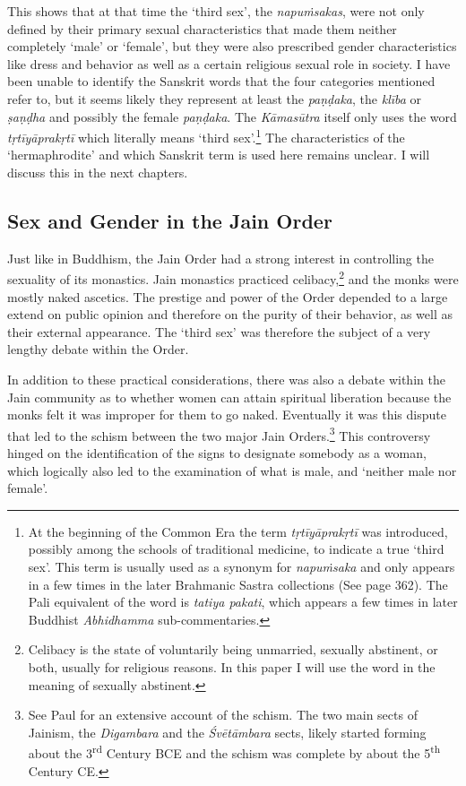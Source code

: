 This shows that at that time the `third sex', the \textit{napuṁsakas}, were not only defined by their primary sexual characteristics that made them neither completely `male' or `female', but they were also prescribed gender characteristics like dress and behavior as well as a certain religious sexual role in society. I have been unable to identify the Sanskrit words that the four categories mentioned refer to, but it seems likely they represent at least the \textit{paṇḍaka}, the \textit{klība} or \textit{ṣaṇḍha} and possibly the female \textit{paṇḍaka}. The \textit{Kāmasūtra} itself only uses the word \textit{tṛtīyāprakṛtī} which literally means `third sex'.\footnote{At the beginning of the Common Era the term \textit{tṛtīyāprakṛtī} was introduced, possibly among the schools of traditional medicine, to indicate a true `third sex'. This term is usually used as a synonym for \textit{napuṁsaka} and only appears in a few times in the later Brahmanic Sastra collections (See \cite{zwilling} page 362). The Pali equivalent of the word is \textit{tatiya pakati}, which appears a few times in later Buddhist \textit{Abhidhamma} sub-commentaries.} The characteristics of the `hermaphrodite' and which Sanskrit term is used here remains unclear. I will discuss this in the next chapters.

\subsection{Sex and Gender in the Jain Order}
Just like in Buddhism, the Jain Order had a strong interest in controlling the sexuality of its monastics. Jain monastics practiced celibacy,\footnote{Celibacy is the state of voluntarily being unmarried, sexually abstinent, or both, usually for religious reasons. In this paper I will use the word in the meaning of sexually abstinent.} and the monks were mostly naked ascetics. The prestige and power of the Order depended to a large extend on public opinion and therefore on the purity of their behavior, as well as their external appearance. The `third sex' was therefore the subject of a very lengthy debate within the Order. 

In addition to these practical considerations, there was also a debate within the Jain community as to whether women can attain spiritual liberation because the monks felt it was improper for them to go naked. Eventually it was this dispute that led to the schism between the two major Jain Orders.\footnote{See Paul \cite{dudas} for an extensive account of the schism. The two main sects of Jainism, the \textit{Digambara} and the \textit{Śvētāmbara} sects, likely started forming about the 3\textsuperscript{rd} Century BCE and the schism was complete by about the 5\textsuperscript{th} Century CE.} This controversy hinged on the identification of the signs to designate somebody as a woman, which logically also led to the examination of what is male, and `neither male nor female'. 

